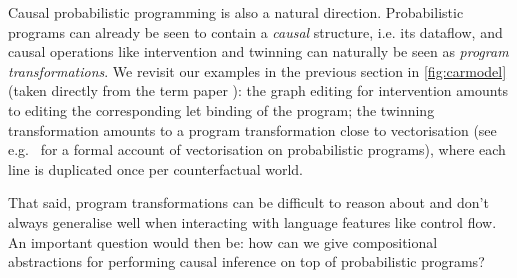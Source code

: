 \documentclass[11pt,a4paper]{article}
\begin{document}
Causal probabilistic programming is also a natural direction. Probabilistic programs can already be seen to contain a \emph{causal} structure, i.e. its dataflow, and causal operations like intervention and twinning can naturally be seen as \emph{program transformations}. We revisit our examples in the previous section in \cref{fig:carmodel} (taken directly from the term paper \cite{wang2026causalppl}): the graph editing for intervention amounts to editing the corresponding let binding of the program; the twinning transformation amounts to a program transformation close to vectorisation (see e.g.\ \cite{lew2019trace} for a formal account of vectorisation on probabilistic programs), where each line is duplicated once per counterfactual world.

That said, program transformations can be difficult to reason about and don't always generalise well when interacting with language features like control flow. An important question would then be: how can we give compositional abstractions for performing causal inference on top of probabilistic programs? 
\end{document}
